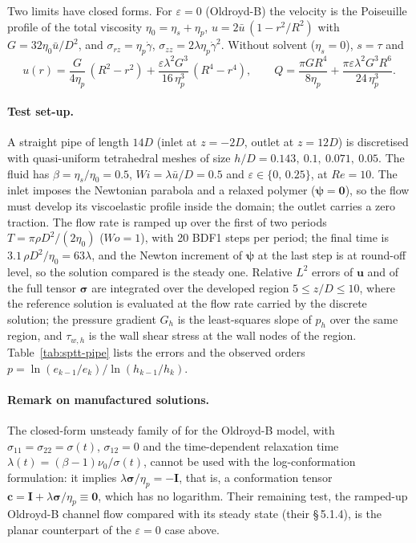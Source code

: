 Two limits have closed forms. For $\varepsilon=0$ (Oldroyd-B) the velocity is the
Poiseuille profile of the total viscosity $\eta_0=\eta_s+\eta_p$,
$u = 2\bar u\,(1-r^2/R^2)$ with $G=32\eta_0\bar u/D^2$, and
$\sigma_{rz}=\eta_p\dot\gamma$, $\sigma_{zz}=2\lambda\eta_p\dot\gamma^2$.
Without solvent ($\eta_s=0$), $s=\tau$ and \citep{OliveiraPinho1999}
\begin{equation}
  u(r) = \frac{G}{4\eta_p}\,(R^2-r^2)
       + \frac{\varepsilon\lambda^2G^3}{16\,\eta_p^3}\,(R^4-r^4),
  \qquad
  Q = \frac{\pi G R^4}{8\eta_p} + \frac{\pi\varepsilon\lambda^2 G^3 R^6}{24\,\eta_p^3}.
  \label{eq:op}
\end{equation}

\paragraph{Test set-up.}
A straight pipe of length $14D$ (inlet at $z=-2D$, outlet at $z=12D$) is
discretised with quasi-uniform tetrahedral meshes of size
$h/D = 0.143,\ 0.1,\ 0.071,\ 0.05$. The fluid has $\beta=\eta_s/\eta_0=0.5$,
$\mathit{Wi}=\lambda\bar u/D=0.5$ and $\varepsilon\in\{0,\,0.25\}$, at
$\mathit{Re}=10$. The inlet imposes the Newtonian parabola and a relaxed
polymer ($\boldsymbol{\psi}=\boldsymbol{0}$), so the flow must develop its
viscoelastic profile inside the domain; the outlet carries a zero traction.
The flow rate is ramped up over the first of two periods
$T=\pi\rho D^2/(2\eta_0)$ ($\mathit{Wo}=1$), with 20 BDF1 steps per period;
the final time is $3.1\,\rho D^2/\eta_0 = 63\lambda$, and the Newton increment
of $\boldsymbol{\psi}$ at the last step is at round-off level, so the
solution compared is the steady one. Relative $L^2$ errors of $\boldsymbol{u}$
and of the full tensor $\boldsymbol{\sigma}$ are integrated over the developed
region $5\le z/D\le 10$, where the reference solution is evaluated at the flow
rate carried by the discrete solution; the pressure gradient $G_h$ is the
least-squares slope of $p_h$ over the same region, and $\tau_{w,h}$ is the
wall shear stress at the wall nodes of the region. Table~\ref{tab:sptt-pipe} lists the errors and the
observed orders $p=\ln(e_{k-1}/e_k)/\ln(h_{k-1}/h_k)$.



\paragraph{Remark on manufactured solutions.}
The closed-form unsteady family of \citet{Pacheco2023} for the Oldroyd-B
model, with $\sigma_{11}=\sigma_{22}=\sigma(t)$, $\sigma_{12}=0$ and the
time-dependent relaxation time $\lambda(t)=(\beta-1)\nu_0/\sigma(t)$, cannot be
used with the log-conformation formulation: it implies
$\lambda\boldsymbol{\sigma}/\eta_p=-\boldsymbol{I}$, that is, a conformation
tensor $\boldsymbol{c}=\boldsymbol{I}+\lambda\boldsymbol{\sigma}/\eta_p\equiv\boldsymbol{0}$,
which has no logarithm. Their remaining test, the ramped-up Oldroyd-B channel
flow compared with its steady state (their \S\,5.1.4), is the planar
counterpart of the $\varepsilon=0$ case above.
